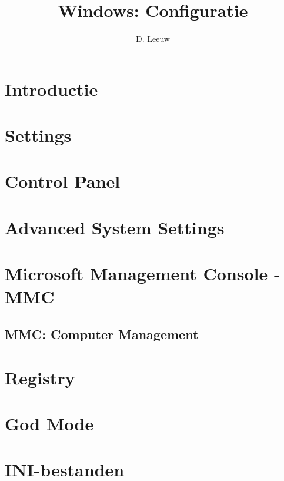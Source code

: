 \documentclass[a4paper,12pt,twoside,titlepage]{article}
\author{D. Leeuw}
\title{Windows: Configuratie}
\date{\today\\
0.0.0
\vfill
\raggedright
\copyright\ 2025 Dennis Leeuw\\
}
\begin{document}

\maketitle



\section{Introductie}


\section{Settings}


\section{Control Panel}


\section{Advanced System Settings}


\section{Microsoft Management Console - MMC}

\subsection{MMC: Computer Management}


\section{Registry}


\section{God Mode}


\section{INI-bestanden}


\printindex
\end{document}

